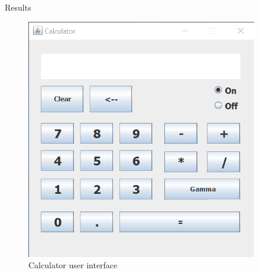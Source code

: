 \documentclass[final]{beamer}
\newlength{\sepwid}
\newlength{\onecolwid}
\newlength{\twocolwid}
\begin{document}
\begin{frame}[t]
\begin{columns}[t]
\begin{column}{\twocolwid}
\begin{columns}[t,totalwidth=\twocolwid]
\begin{column}{\onecolwid}
\begin{block}{Results}
\begin{figure}
\includegraphics[width=0.7\linewidth]{calculator.png}
\caption{Calculator user interface}
\end{figure}


\end{block}


\end{column} %

\end{columns} %

\end{column} %

\begin{column}{\sepwid}\end{column} %

\begin{column}{\onecolwid} %



\end{column}
\end{columns}
\end{frame}
\end{document}
